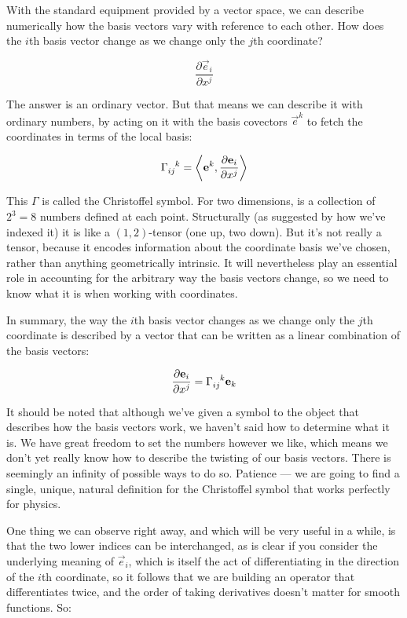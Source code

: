 With the standard equipment provided by a vector space, we can describe numerically how the basis vectors vary with reference to each other. How does the $i$th basis vector change as we change only the $j$th coordinate?

$$
\frac{\partial \vec{e}_i}{\partial x^j}
$$

The answer is an ordinary vector. But that means we can describe it with ordinary numbers, by acting on it with the basis covectors $\vec{e}^k$ to fetch the coordinates in terms of the local basis:

$$
\Gamma\indices{_i_j^k} = \biggl< \vec{e}^k , \frac{\partial \vec{e}_i}{\partial x^j} \biggr>
$$

This $\Gamma$ is called the Christoffel symbol. For two dimensions, is a collection of $2^3 = 8$ numbers defined at each point. Structurally (as suggested by how we've indexed it) it is like a $(1, 2)$-tensor (one up, two down). But it's not really a tensor, because it encodes information about the coordinate basis we've chosen, rather than anything geometrically intrinsic. It will nevertheless play an essential role in accounting for the arbitrary way the basis vectors change, so we need to know what it is when working with coordinates.

In summary, the way the $i$th basis vector changes as we change only the $j$th coordinate is described by a vector that can be written as a linear combination of the basis vectors:

$$
\frac{\partial \vec{e}_i}{\partial x^j}
= \Gamma\indices{_i_j^k} \vec{e}_k
$$

It should be noted that although we've given a symbol to the object that describes how the basis vectors work, we haven't said how to determine what it is. We have great freedom to set the numbers however we like, which means we don't yet really know how to describe the twisting of our basis vectors. There is seemingly an infinity of possible ways to do so. Patience --- we are going to find a single, unique, natural definition for the Christoffel symbol that works perfectly for physics.

One thing we can observe right away, and which will be very useful in a while, is that the two lower indices can be interchanged, as is clear if you consider the underlying meaning of $\vec{e}_i$, which is itself the act of differentiating in the direction of the $i$th coordinate, so it follows that we are building an operator that differentiates twice, and the order of taking derivatives doesn't matter for smooth functions. So:

